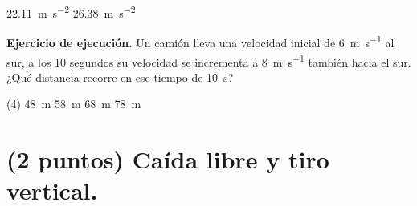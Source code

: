 \documentclass[12pt, letter]{exam}
\begin{document}
\begin{questions}
\begin{tasks}
        \task \SI{22.11}{\meter\per\square\second}
        \task \SI{26.38}{\meter\per\square\second}
    \end{tasks}
    \question \label{Ejercicio_04} \textbf{Ejercicio de ejecución.} Un camión lleva una velocidad inicial de \SI{6}{\meter\per\second} al sur, a los \num{10} segundos su velocidad se incrementa a \SI{8}{\meter\per\second} también hacia el sur. ¿Qué distancia recorre en ese tiempo de \SI{10}{\second}?
    \begin{tasks}(4)
        \task \SI{48}{\meter}
        \task \SI{58}{\meter}
        \task \SI{68}{\meter}
        \task \SI{78}{\meter}
    \end{tasks}
    
    \section{(2 puntos) Caída libre y tiro vertical.}
    

\end{questions}
\end{document}

